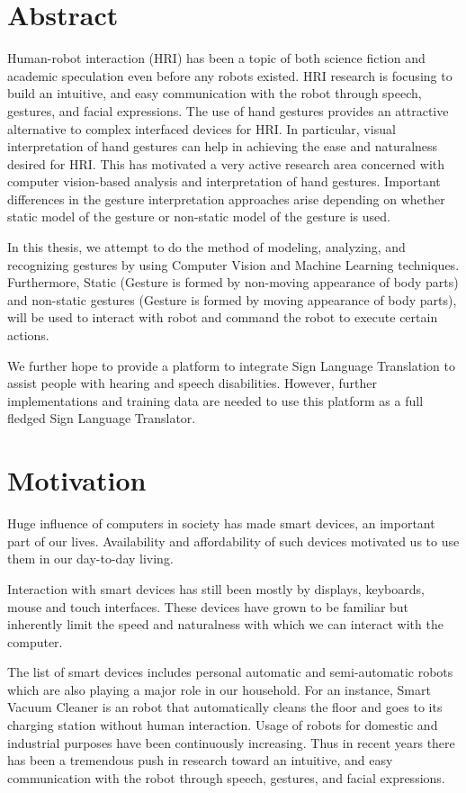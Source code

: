 \chapter{Abstract} Human-robot interaction (HRI) has been a topic of both science fiction and academic speculation even before any robots existed. HRI research is focusing to build an intuitive, and easy communication with the robot through speech, gestures, and facial expressions. The use of hand gestures provides an attractive alternative to complex interfaced devices for HRI. In particular, visual interpretation of hand gestures can help in achieving the ease and naturalness desired for HRI. This has motivated a very active research area concerned with computer vision-based analysis and interpretation of hand gestures. Important differences in the gesture interpretation approaches arise depending on whether static model of the gesture or non-static model of the gesture is used. 

In this thesis, we attempt to do the method of modeling, analyzing, and recognizing gestures by using Computer Vision and Machine Learning techniques. Furthermore, Static (Gesture is formed by non-moving appearance of body parts) and non-static gestures (Gesture is formed by moving appearance of body parts), will be used to interact with robot and command the robot to execute certain actions.

We further hope to provide a platform to integrate Sign Language Translation to assist people with hearing and speech disabilities. However, further implementations and training data are needed to use this platform as a full fledged Sign Language Translator.

\chapter{Motivation} Huge influence of computers in society has made smart devices, an important part of our lives. Availability and affordability of such devices motivated us to use them in our day-to-day living. 

Interaction with smart devices has still been mostly by displays, keyboards, mouse and touch interfaces. These devices have grown to be familiar but inherently limit the speed and naturalness with which we can interact with the computer. 

The list of smart devices includes personal automatic and semi-automatic robots which are also playing a major role in our household. For an instance, Smart Vacuum Cleaner is an robot that automatically cleans the floor and goes to its charging station without human interaction. Usage of robots for domestic and industrial purposes have been continuously increasing. Thus in recent years there has been a tremendous push in research toward an intuitive, and easy communication with the robot through speech, gestures, and facial expressions.

